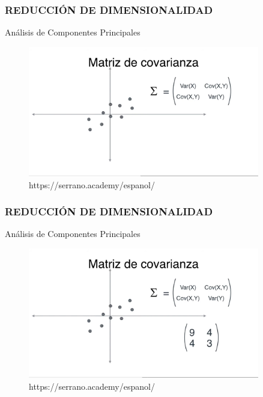 \documentclass{beamer}
\begin{document}
\begin{frame}
\frametitle{REDUCCIÓN DE DIMENSIONALIDAD}
\begin{block}{Análisis de Componentes Principales}	
	\begin{figure}
		\includegraphics[width=0.9\textwidth]{PCA/IMG_3567.jpg}
		\caption{https://serrano.academy/espanol/}
	\end{figure}
\end{block}
\end{frame}

\begin{frame}
\frametitle{REDUCCIÓN DE DIMENSIONALIDAD}
\begin{block}{Análisis de Componentes Principales}	
	\begin{figure}
		\includegraphics[width=0.9\textwidth]{PCA/IMG_3568.jpg}
		\caption{https://serrano.academy/espanol/}
	\end{figure}
\end{block}
\end{frame}
\end{document}
